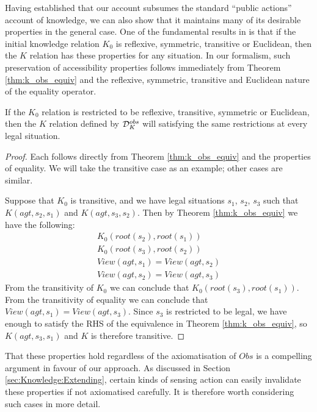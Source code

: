 Having established that our account subsumes the standard {}``public
actions'' account of knowledge, we can also show that it maintains
many of its desirable properties in the general case. One of the fundamental
results in \citep{scherl03sc_knowledge} is that if the initial knowledge
relation $K_{0}$ is reflexive, symmetric, transitive or Euclidean,
then the $K$ relation has these properties for any situation. In
our formalism, such preservation of accessibility properties follows
immediately from Theorem \ref{thm:k_obs_equiv} and the reflexive,
symmetric, transitive and Euclidean nature of the equality operator.

\begin{thm}
If the $K_{0}$ relation is restricted to be reflexive, transitive,
symmetric or Euclidean, then the $K$ relation defined by $\mathcal{D}_{K}^{obs}$
will satisfying the same restrictions at every legal situation. \label{thm:Knowledge:Accessibility} 
\end{thm}
\begin{proof}
Each follows directly from Theorem \ref{thm:k_obs_equiv} and the
properties of equality. We will take the transitive case as an example;
other cases are similar.

Suppose that $K_{0}$ is transitive, and we have legal situations
$s_{1}$, $s_{2}$, $s_{3}$ such that $K(agt,s_{2},s_{1})$ and $K(agt,s_{3},s_{2})$.
Then by Theorem \ref{thm:k_obs_equiv} we have the following:\begin{gather*}
K_{0}(root(s_{2}),root(s_{1}))\\
K_{0}(root(s_{3}),root(s_{2}))\\
View(agt,s_{1})=View(agt,s_{2})\\
View(agt,s_{2})=View(agt,s_{3})\end{gather*}
 From the transitivity of $K_{0}$ we can conclude that $K_{0}(root(s_{3}),root(s_{1}))$.
From the transitivity of equality we can conclude that $View(agt,s_{1})=View(agt,s_{3})$.
Since $s_{3}$ is restricted to be legal, we have enough to satisfy
the RHS of the equivalence in Theorem \ref{thm:k_obs_equiv}, so $K(agt,s_{3},s_{1})$
and $K$ is therefore transitive. 
\end{proof}
That these properties hold regardless of the axiomatisation of $Obs$
is a compelling argument in favour of our approach. As discussed in
Section \ref{sec:Knowledge:Extending}, certain kinds of sensing action
can easily invalidate these properties if not axiomatised carefully.
It is therefore worth considering such cases in more detail.

